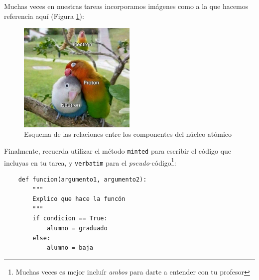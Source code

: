 \documentclass{assignment}
\begin{document}
\begin{problem}
\noindent Muchas veces en nuestras tareas incorporamos imágenes como a la que hacemos referencia aquí (Figura \ref{fig:yo_en_la_vida}):
\begin{figure}[ht] %
    \centering
    \includegraphics[width=0.5\textwidth]{Figuras/Cotorros.jpg} %
    \caption{Esquema de las relaciones entre los componentes del núcleo atómico}
    \label{fig:yo_en_la_vida}
\end{figure}

\noindent Finalmente, recuerda utilizar el método \texttt{minted} para escribir el código que incluyas en tu tarea, y \texttt{verbatim} para el \textit{pseudo}-código\footnote{Muchas veces es mejor incluír \textit{ambos} para darte a entender con tu profesor}:

\begin{verbatim}
    def funcion(argumento1, argumento2):
        """
        Explico que hace la funcón
        """
        if condicion == True:
            alumno = graduado
        else:
            alumno = baja
\end{verbatim}

\end{problem}


    




\newpage

\nocite{*} %

\end{document}
